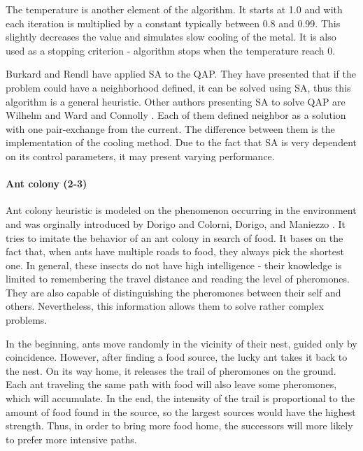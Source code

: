 The temperature is another element of the algorithm.
It starts at 1.0 and with each iteration is multiplied by a constant typically between 0.8 and 0.99.
This slightly decreases the value and simulates slow cooling of the metal.
It is also used as a stopping criterion - algorithm stops when the temperature reach 0.

Burkard and Rendl \cite{burkard1984thermodynamically} have applied SA to the QAP.
They have presented that if the problem could have a neighborhood defined, it can be solved using SA, thus this algorithm is a general heuristic.
Other authors presenting SA to solve QAP are Wilhelm and Ward \cite{wilhelm1987solving} and Connolly \cite{connolly1990improved}.
Each of them defined neighbor as a solution with one pair-exchange from the current.
The difference between them is the implementation of the cooling method.
Due to the fact that SA is very dependent on its control parameters, it may present varying performance.

\paragraph{Ant colony (2-3)}

Ant colony heuristic is modeled on the phenomenon occurring in the environment and was orginally introduced by Dorigo \cite{dorigo1992optimization} and Colorni, Dorigo, and Maniezzo \cite{dorigo1996ant}.
It tries to imitate the behavior of an ant colony in search of food.
It bases on the fact that, when ants have multiple roads to food, they always pick the shortest one.
In general, these insects do not have high intelligence - their knowledge is limited to remembering the travel distance and reading the level of pheromones.
They are also capable of distinguishing the pheromones between their self and others.
Nevertheless, this information allows them to solve rather complex problems.

In the beginning, ants move randomly in the vicinity of their nest, guided only by coincidence.
However, after finding a food source, the lucky ant takes it back to the nest.
On its way home, it releases the trail of pheromones on the ground.
Each ant traveling the same path with food will also leave some pheromones, which will accumulate.
In the end, the intensity of the trail is proportional to the amount of food found in the source, so the largest sources would have the highest strength.
Thus, in order to bring more food home, the successors will more likely to prefer more intensive paths.

